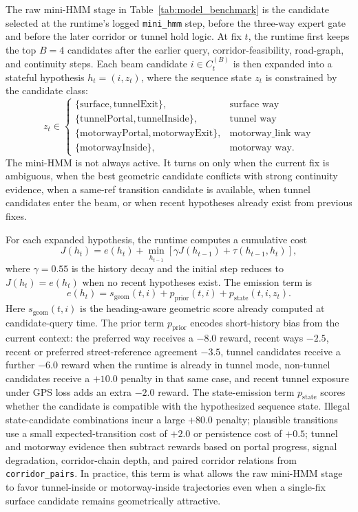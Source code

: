 \documentclass{article}
\begin{document}
\noindent
The raw mini-HMM stage in Table~\ref{tab:model_benchmark} is the candidate selected at the runtime's logged \texttt{mini\_hmm} step, before the three-way expert gate and before the later corridor or tunnel hold logic. At fix \(t\), the runtime first keeps the top \(B=4\) candidates after the earlier query, corridor-feasibility, road-graph, and continuity steps. Each beam candidate \(i \in C_t^{(B)}\) is then expanded into a stateful hypothesis \(h_t=(i,z_t)\), where the sequence state \(z_t\) is constrained by the candidate class:
\[
z_t \in
\begin{cases}
\{\text{surface}, \text{tunnelExit}\}, & \text{surface way} \\
\{\text{tunnelPortal}, \text{tunnelInside}\}, & \text{tunnel way} \\
\{\text{motorwayPortal}, \text{motorwayExit}\}, & \text{motorway\_link way} \\
\{\text{motorwayInside}\}, & \text{motorway way.}
\end{cases}
\]
The mini-HMM is not always active. It turns on only when the current fix is ambiguous, when the best geometric candidate conflicts with strong continuity evidence, when a same-ref transition candidate is available, when tunnel candidates enter the beam, or when recent hypotheses already exist from previous fixes.

For each expanded hypothesis, the runtime computes a cumulative cost
\[
J(h_t) = e(h_t) + \min_{h_{t-1}}\left[\gamma J(h_{t-1}) + \tau(h_{t-1}, h_t)\right],
\]
where \(\gamma = 0.55\) is the history decay and the initial step reduces to \(J(h_t)=e(h_t)\) when no recent hypotheses exist. The emission term is
\[
e(h_t) = s_{\mathrm{geom}}(t,i) + p_{\mathrm{prior}}(t,i) + p_{\mathrm{state}}(t,i,z_t).
\]
Here \(s_{\mathrm{geom}}(t,i)\) is the heading-aware geometric score already computed at candidate-query time. The prior term \(p_{\mathrm{prior}}\) encodes short-history bias from the current context: the preferred way receives a \(-8.0\) reward, recent ways \(-2.5\), recent or preferred street-reference agreement \(-3.5\), tunnel candidates receive a further \(-6.0\) reward when the runtime is already in tunnel mode, non-tunnel candidates receive a \(+10.0\) penalty in that same case, and recent tunnel exposure under GPS loss adds an extra \(-2.0\) reward. The state-emission term \(p_{\mathrm{state}}\) scores whether the candidate is compatible with the hypothesized sequence state. Illegal state-candidate combinations incur a large \(+80.0\) penalty; plausible transitions use a small expected-transition cost of \(+2.0\) or persistence cost of \(+0.5\); tunnel and motorway evidence then subtract rewards based on portal progress, signal degradation, corridor-chain depth, and paired corridor relations from \texttt{corridor\_pairs}. In practice, this term is what allows the raw mini-HMM stage to favor tunnel-inside or motorway-inside trajectories even when a single-fix surface candidate remains geometrically attractive.
\end{document}
